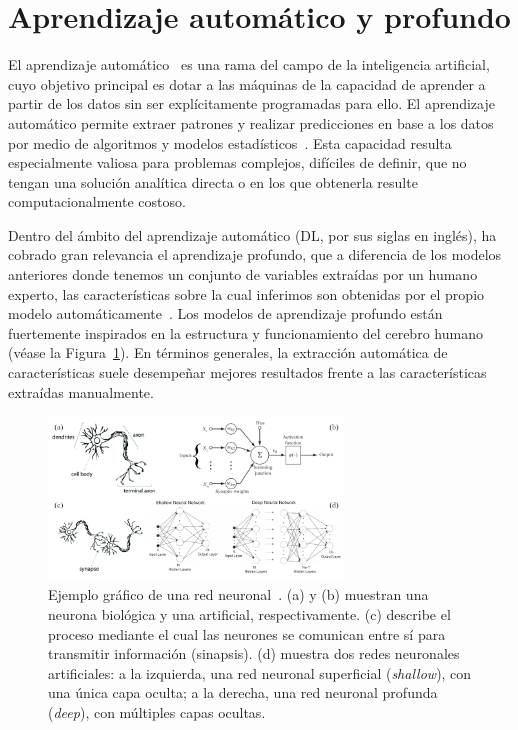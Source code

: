 \section{Aprendizaje automático y profundo}
El aprendizaje automático~\cite{IAModernApproach} es una rama del campo de la inteligencia artificial, 
cuyo objetivo principal es dotar a las máquinas de la capacidad de aprender a partir de los datos sin ser explícitamente
programadas para ello. El aprendizaje automático permite extraer patrones y realizar predicciones en base a los datos por 
medio de algoritmos y modelos estadísticos~\cite{LearningFromData}. Esta capacidad resulta especialmente valiosa para 
problemas complejos, difíciles de definir, que no tengan una solución analítica directa o en los que obtenerla resulte computacionalmente costoso.
\par 
Dentro del ámbito del aprendizaje automático (DL, por sus siglas en inglés), ha cobrado gran relevancia el aprendizaje profundo, 
que a diferencia de los modelos anteriores donde tenemos un conjunto de variables 
extraídas por un humano experto, las características sobre la cual inferimos 
son obtenidas por el propio modelo automáticamente~\cite{DeepLMITPress, DeepLearningNature, DeepLearningInNN}.
Los modelos de aprendizaje profundo están fuertemente inspirados en la estructura y funcionamiento del cerebro humano (véase la Figura~\ref{fig:ANNVisualization}). 
En términos generales, la extracción automática de características suele 
desempeñar mejores resultados frente a las características extraídas manualmente.
\par
\begin{figure}[htp]
  \centering
  \includegraphics[width=0.7\textwidth]{imagenes/chapter2/ANNVisualization.png}
  \caption[Ejemplo gráfico de una red neuronal.]
  {Ejemplo gráfico de una red neuronal~\cite{NeuronImages, NeuronSimilarity,ShallowAndDeepNN}. 
    (a) y (b) muestran una neurona biológica y una artificial, respectivamente. 
    (c) describe el proceso mediante el cual las neurones se comunican entre sí para transmitir información (sinapsis). 
    (d) muestra dos redes neuronales artificiales: 
    a la izquierda, una red neuronal superficial (\emph{shallow}), con una única 
    capa oculta; a la derecha, una red neuronal profunda (\emph{deep}), con múltiples capas ocultas.
  }
  \label{fig:ANNVisualization}
\end{figure}
